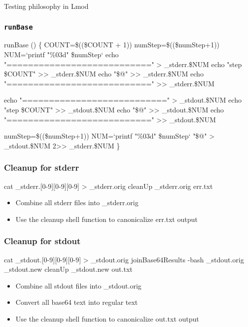 \documentclass{beamer}
\begin{document}
\begin{rame}{Testing philosophy in Lmod}
\begin{frame}[fragile]
  \frametitle{\texttt{runBase}}
    {\tiny
\begin{semiverbatim}
runBase ()
\{
   COUNT=\$((\$COUNT + 1))
   numStep=\$((\$numStep+1)) 
   NUM=`printf "\%03d" \$numStep`
   echo "===========================" >  \_stderr.\$NUM
   echo "step \$COUNT"                 >> \_stderr.\$NUM
   echo "\$@"                          >> \_stderr.\$NUM
   echo "===========================" >> \_stderr.\$NUM

   echo "===========================" >  \_stdout.\$NUM
   echo "step \$COUNT"                 >> \_stdout.\$NUM
   echo "\$@"                          >> \_stdout.\$NUM
   echo "===========================" >> \_stdout.\$NUM

   numStep=\$((\$numStep+1))
   NUM=`printf "\%03d" \$numStep`
   "\$@" > \_stdout.\$NUM 2>> \_stderr.\$NUM
\}
\end{semiverbatim}
    }
\end{frame}


\begin{frame}[fragile]
  \frametitle{Cleanup for stderr}
    {\tiny
\begin{semiverbatim}
     cat \_stderr.[0-9][0-9][0-9] > \_stderr.orig
     cleanUp \_stderr.orig err.txt
\end{semiverbatim}
    }
    \begin{itemize}
      \item Combine all stderr files into \_stderr.orig
      \item Use the cleanup shell function to canonicalize err.txt output
    \end{itemize}
\end{frame}

\begin{frame}[fragile]
  \frametitle{Cleanup for stdout}
    {\tiny
\begin{semiverbatim}
     cat \_stdout.[0-9][0-9][0-9] > \_stdout.orig
     joinBase64Results  -bash  \_stdout.orig \_stdout.new
     cleanUp \_stdout.new out.txt
\end{semiverbatim}
    }
    \begin{itemize}
      \item Combine all stdout files into \_stdout.orig
      \item Convert all base64 text into regular text
      \item Use the cleanup shell function to canonicalize out.txt output
    \end{itemize}
\end{frame}


\end{rame}
\end{document}
